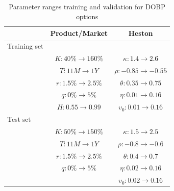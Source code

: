 \documentclass[12pt,a4paper,oneside]{book}
\begin{document}
\begin{table}\centering 
\begin{tabular}[t]{lcc}\toprule
            &   Product/Market  &  Heston   \\ \midrule
            Training set && \\\addlinespace
 & $K: 40 \% \rightarrow 160\%$ & $\kappa: 1.4 \rightarrow 2.6$  \\\addlinespace
			   & $T: 11M \rightarrow 1Y$      &  $\rho: -0.85 \rightarrow -0.55$       \\\addlinespace
			   & $r: 1.5\% \rightarrow 2.5\%  $   & $\theta: 0.35 \rightarrow 0.75$         \\\addlinespace
			   & $q: 0 \%  \rightarrow 5 \%$    & $\eta: 0.01 \rightarrow 0.16$            \\\addlinespace
			   &  $H: 0.55 \rightarrow 0.99$      &  $v_0: 0.01 \rightarrow 0.16$          \\\addlinespace
			    Test set && \\\addlinespace
 & $K: 50 \% \rightarrow 150\%$ & $\kappa: 1.5 \rightarrow 2.5$  \\\addlinespace
			   & $T: 11M \rightarrow 1Y$      &  $\rho: -0.8 \rightarrow -0.6$       \\\addlinespace
			   & $r: 1.5\% \rightarrow 2.5\%  $   & $\theta: 0.4 \rightarrow 0.7$       \\\addlinespace
			   & $q: 0 \%  \rightarrow 5 \%$    & $\eta: 0.02 \rightarrow 0.16$           \\\addlinespace
			   &      &  $v_0: 0.02 \rightarrow 0.16$         \\\bottomrule
\end{tabular}
\caption{Parameter ranges training and validation for DOBP options }\label{table_DOBP}
\end{table}
\end{document}
